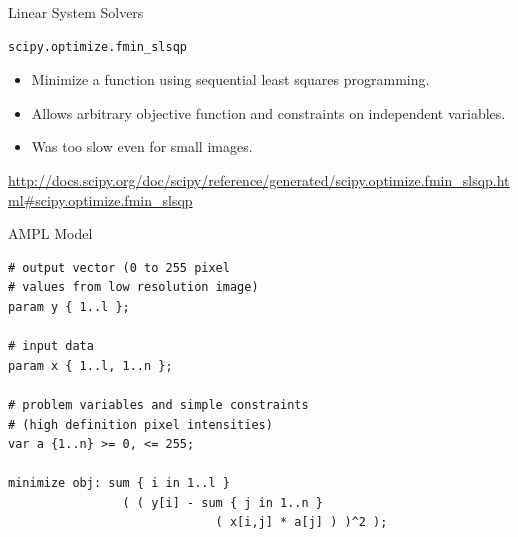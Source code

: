 \documentclass{beamer}
\begin{document}

\begin{frame}[fragile]{Linear System Solvers}

\begin{verbatim}
scipy.optimize.fmin_slsqp
\end{verbatim}

\begin{itemize}
\item Minimize a function using sequential least squares programming.

\vspace{0.3cm}

\item Allows arbitrary objective function and constraints on independent variables.

\vspace{0.3cm}

\item Was too slow even for small images.

\end{itemize}

\vspace{0.5cm}

\tiny{\url{http://docs.scipy.org/doc/scipy/reference/generated/scipy.optimize.fmin_slsqp.html#scipy.optimize.fmin_slsqp}}

\end{frame}


\begin{frame}[fragile]{AMPL Model}

\begin{verbatim}
# output vector (0 to 255 pixel
# values from low resolution image)
param y { 1..l };

# input data
param x { 1..l, 1..n };

# problem variables and simple constraints
# (high definition pixel intensities)
var a {1..n} >= 0, <= 255;

minimize obj: sum { i in 1..l }
                ( ( y[i] - sum { j in 1..n }
                             ( x[i,j] * a[j] ) )^2 );
\end{verbatim}

\end{frame}

\end{document}

